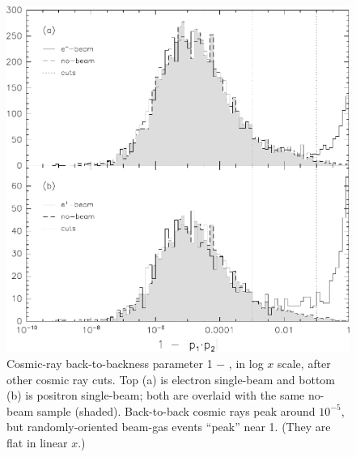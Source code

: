 \begin{figure}[p]
  \begin{center}
    \includegraphics[width=\linewidth]{plots/datasets_cosmicscale}
  \end{center}
  \caption{\label{datasets:cosmicscale} Cosmic-ray back-to-backness
    parameter 1 $-$ \pdotp, in log $x$ scale, after other cosmic ray
    cuts.  Top (a) is electron single-beam and bottom (b) is positron
    single-beam; both are overlaid with the same no-beam sample
    (shaded).  Back-to-back cosmic rays peak around $10^{-5}$, but
    randomly-oriented beam-gas events ``peak'' near 1.  (They are flat
    in linear $x$.)}
\end{figure}

